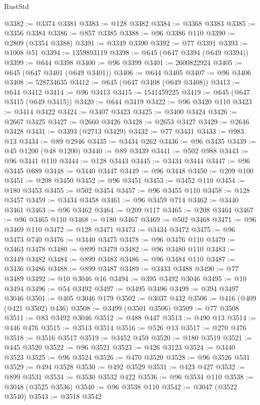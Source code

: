 \begin{lexlean}{RustStd}
\begin{coremodule}
@3382 := @3374 @3381
@3383 := @128 @3382
@3384 := @3368 @3383
@3385 := @3356 @3384
@3386 := @857 @3385
@3388 := @96 @3386 @110
@3390 := @2809 (@3354 @3388)
@3391 := @3349 @3390
@3392 := @77 @3391
@3393 := @1008 @51
@3394 := 1359893119
@3398 := @645 (@647 @3394 (@649 @3394))
@3399 := @644 @3398
@3400 := @96 @3399
@3401 := 2600822924
@3405 := @645 (@647 @3401 (@649 @3401))
@3406 := @644 @3405
@3407 := @96 @3406
@3408 := 528734635
@3412 := @645 (@647 @3408 (@649 @3408))
@3413 := @644 @3412
@3414 := @96 @3413
@3415 := 1541459225
@3419 := @645 (@647 @3415 (@649 @3415))
@3420 := @644 @3419
@3422 := @96 @3420 @110
@3423 := @3414 @3422
@3424 := @3407 @3423
@3425 := @3400 @3424
@3426 := @2667 @3425
@3427 := @2660 @3426
@3428 := @2653 @3427
@3429 := @2646 @3428
@3431 := @3393 (@2713 @3429)
@3432 := @77 @3431
@3433 := @983 @13
@3434 := @89 @2946
@3435 := @3434 @262
@3436 := @96 @3435
@3439 := @45 @1200 (@48 @1200)
@3440 := @89 @3439
@3441 := @502 @988
@3443 := @96 @3441 @110
@3444 := @128 @3443
@3445 := @3434 @3444
@3447 := @96 @3445 @689
@3448 := @3440 @3447
@3449 := @96 @3448
@3450 := @209 @100
@3451 := @208 @3450
@3452 := @96 @3451
@3453 := @3452 @110
@3454 := @180 @3453
@3455 := @502 @3454
@3457 := @96 @3455 @110
@3458 := @128 @3457
@3459 := @3434 @3458
@3461 := @96 @3459 @714
@3462 := @3440 @3461
@3463 := @96 @3462
@3464 := @209 @117
@3465 := @208 @3464
@3467 := @96 @3465 @110
@3468 := @180 @3467
@3469 := @502 @3468
@3471 := @96 @3469 @110
@3472 := @128 @3471
@3473 := @3434 @3472
@3475 := @96 @3473 @740
@3476 := @3440 @3475
@3478 := @96 @3476 @110
@3479 := @3463 @3478
@3480 := @899 @3479
@3482 := @96 @3480 @110
@3483 := @3449 @3482
@3484 := @899 @3483
@3486 := @96 @3484 @110
@3487 := @3436 @3486
@3488 := @899 @3487
@3489 := @3433 @3488
@3490 := @77 @3489
@3492 := @10 @3046 @16
@3494 := @395 @3492 @3046
@3495 := @10 @3494
@3496 := @54 @3492
@3497 := @3495 @3496
@3499 := @394 @3497 @3046
@3501 := @405 @3046 @179
@3502 := @3037 @432
@3506 := @416 (@409 (@421 @3502) @436)
@3508 := @3499 (@3501 @3506)
@3509 := @77 @3508
@3511 := @83 @3492 @3046
@3512 := @488 @447
@3513 := @490 @13
@3514 := @446 @476
@3515 := @3513 @3514
@3516 := @526 @13
@3517 := @270 @476
@3518 := @3516 @3517
@3519 := @3452 @459
@3520 := @180 @3519
@3521 := @445 @3520
@3522 := @96 @3521
@3523 := @426 @3123
@3524 := @3440 @3523
@3525 := @96 @3524
@3526 := @470 @3520
@3528 := @96 @3526 @531
@3529 := @494 @3528
@3530 := @492 @3529
@3531 := @423 @427
@3532 := @899 @3531
@3534 := @3530 @3532 @422
@3536 := @96 @3534 @110
@3538 := @3048 (@3525 @3536)
@3540 := @96 @3538 @110
@3542 := @3047 (@3522 @3540)
@3543 := @3518 @3542

\end{coremodule}
\end{lexlean}
